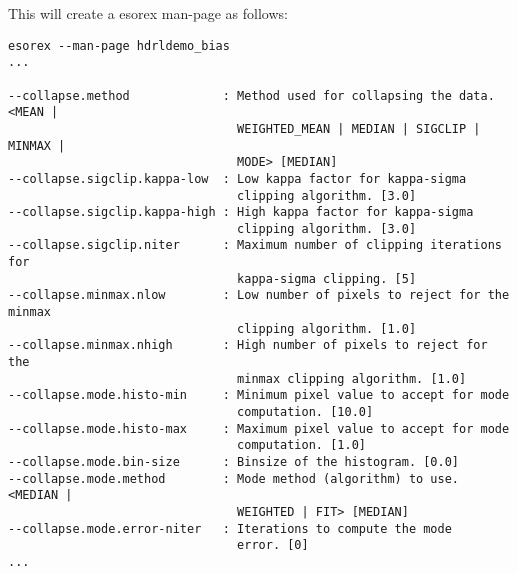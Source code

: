 This will create a esorex man-page as follows:
{\footnotesize
\begin{verbatim}
esorex --man-page hdrldemo_bias
...

--collapse.method             : Method used for collapsing the data. <MEAN |
                                WEIGHTED_MEAN | MEDIAN | SIGCLIP | MINMAX | 
                                MODE> [MEDIAN]
--collapse.sigclip.kappa-low  : Low kappa factor for kappa-sigma
                                clipping algorithm. [3.0]
--collapse.sigclip.kappa-high : High kappa factor for kappa-sigma
                                clipping algorithm. [3.0]
--collapse.sigclip.niter      : Maximum number of clipping iterations for
                                kappa-sigma clipping. [5]
--collapse.minmax.nlow        : Low number of pixels to reject for the minmax
                                clipping algorithm. [1.0]
--collapse.minmax.nhigh       : High number of pixels to reject for the
                                minmax clipping algorithm. [1.0]
--collapse.mode.histo-min     : Minimum pixel value to accept for mode
                                computation. [10.0]
--collapse.mode.histo-max     : Maximum pixel value to accept for mode
                                computation. [1.0]
--collapse.mode.bin-size      : Binsize of the histogram. [0.0]
--collapse.mode.method        : Mode method (algorithm) to use. <MEDIAN |
                                WEIGHTED | FIT> [MEDIAN]
--collapse.mode.error-niter   : Iterations to compute the mode
                                error. [0]
...
\end{verbatim}
}
